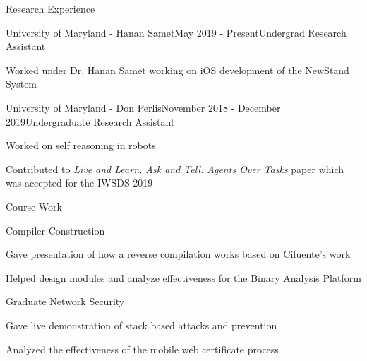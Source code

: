 \documentclass{resume} %
\begin{document}


\begin{rSection}{Research Experience}

\begin{rSubsection}{University of Maryland - Hanan Samet}{May 2019 - Present}{Undergrad Research Assistant}{}
\item Worked under Dr. Hanan Samet working on iOS development of the NewStand System
\end{rSubsection}

\begin{rSubsection}{University of Maryland - Don Perlis}{November 2018 - December 2019}{Undergraduate Research Assistant}{}
\item Worked on self reasoning in robots
\item Contributed to \textit{Live and Learn, Ask and Tell: Agents Over Tasks} paper which was accepted for the IWSDS 2019
\end{rSubsection}

\end{rSection}



\begin{rSection}{Course Work}

\begin{rSubsection}{Compiler Construction}{}{}{}
\item Gave presentation of how a reverse compilation works based on Cifuente's work
\item Helped design modules and analyze effectiveness for the Binary Analysis Platform
\end{rSubsection}

\begin{rSubsection}{Graduate Network Security}{}{}{}
\item Gave live demonstration of stack based attacks and prevention
\item Analyzed the effectiveness of the mobile web certificate process
\end{rSubsection}

\end{rSection}
\end{document}
